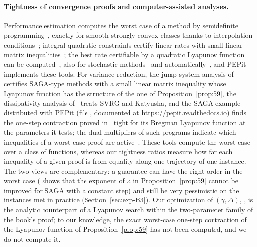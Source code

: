 \paragraph{Tightness of convergence proofs and computer-assisted analyses.}
Performance estimation computes the worst case of a method by semidefinite programming~\cite{drori2014performance},
exactly for smooth strongly convex classes thanks to interpolation conditions~\cite{taylor2017smooth}; integral
quadratic constraints certify linear rates with small linear matrix inequalities~\cite{lessard2016analysis}; the best
rate certifiable by a quadratic Lyapunov function can be computed~\cite{taylor2018lyapunov}, also for stochastic
methods~\cite{taylor2019stochastic} and automatically~\cite{upadhyaya2024automated,upadhyaya2025autolyap}, and
PEPit~\cite{goujaud2024pepit} implements these tools. For variance reduction, the jump-system analysis
of~\cite{hu2017unified} certifies SAGA-type methods with a small linear matrix inequality whose Lyapunov function has
the structure of the one of Proposition~\ref{prop:59}, the dissipativity analysis of~\cite{hu2018dissipativity}
treats SVRG and Katyusha, and the SAGA example distributed with PEPit (file
, documented at
\url{https://pepit.readthedocs.io}) finds the one-step contraction proved in~\cite{defazio2014saga} tight for its
Bregman Lyapunov function at the
parameters it tests; the dual multipliers of such programs indicate which inequalities of a worst-case proof are
active~\cite{goujaud2023fundamental}. These tools compute the worst case over a class of functions, whereas our
tightness ratios measure how far each inequality of a given proof is from equality along one trajectory of one
instance. The two views are complementary: a guarantee can have the right order in the worst case
( shows that the exponent of $\kappa$ in Proposition~\ref{prop:59} cannot be improved for SAGA
with a constant step) and still be very pessimistic on the instances met in practice (Section~\ref{sec:exp-B3}). Our
optimization of $(\gamma,\Delta)$, , is the analytic counterpart of a Lyapunov search within
the two-parameter family of the book's proof; to our knowledge, the exact worst-case one-step contraction of the
Lyapunov function of Proposition~\ref{prop:59} has not been computed, and we do not compute it.

